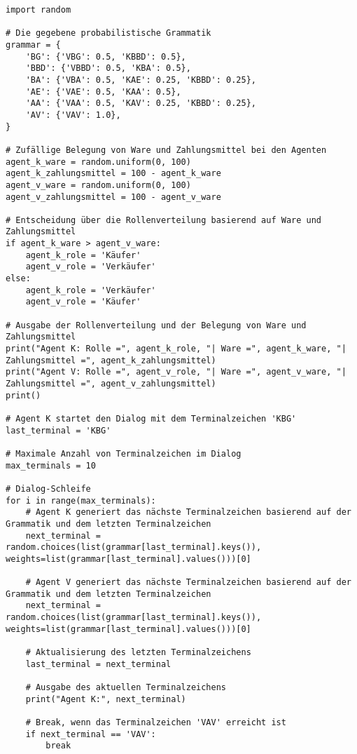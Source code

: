 \documentclass[12pt]{article}
\begin{document}
\begin{verbatim}
import random

# Die gegebene probabilistische Grammatik
grammar = {
    'BG': {'VBG': 0.5, 'KBBD': 0.5},
    'BBD': {'VBBD': 0.5, 'KBA': 0.5},
    'BA': {'VBA': 0.5, 'KAE': 0.25, 'KBBD': 0.25},
    'AE': {'VAE': 0.5, 'KAA': 0.5},
    'AA': {'VAA': 0.5, 'KAV': 0.25, 'KBBD': 0.25},
    'AV': {'VAV': 1.0},
}

# Zufällige Belegung von Ware und Zahlungsmittel bei den Agenten
agent_k_ware = random.uniform(0, 100)
agent_k_zahlungsmittel = 100 - agent_k_ware
agent_v_ware = random.uniform(0, 100)
agent_v_zahlungsmittel = 100 - agent_v_ware

# Entscheidung über die Rollenverteilung basierend auf Ware und Zahlungsmittel
if agent_k_ware > agent_v_ware:
    agent_k_role = 'Käufer'
    agent_v_role = 'Verkäufer'
else:
    agent_k_role = 'Verkäufer'
    agent_v_role = 'Käufer'

# Ausgabe der Rollenverteilung und der Belegung von Ware und Zahlungsmittel
print("Agent K: Rolle =", agent_k_role, "| Ware =", agent_k_ware, "| Zahlungsmittel =", agent_k_zahlungsmittel)
print("Agent V: Rolle =", agent_v_role, "| Ware =", agent_v_ware, "| Zahlungsmittel =", agent_v_zahlungsmittel)
print()

# Agent K startet den Dialog mit dem Terminalzeichen 'KBG'
last_terminal = 'KBG'

# Maximale Anzahl von Terminalzeichen im Dialog
max_terminals = 10

# Dialog-Schleife
for i in range(max_terminals):
    # Agent K generiert das nächste Terminalzeichen basierend auf der Grammatik und dem letzten Terminalzeichen
    next_terminal = random.choices(list(grammar[last_terminal].keys()), weights=list(grammar[last_terminal].values()))[0]
    
    # Agent V generiert das nächste Terminalzeichen basierend auf der Grammatik und dem letzten Terminalzeichen
    next_terminal = random.choices(list(grammar[last_terminal].keys()), weights=list(grammar[last_terminal].values()))[0]

    # Aktualisierung des letzten Terminalzeichens
    last_terminal = next_terminal
    
    # Ausgabe des aktuellen Terminalzeichens
    print("Agent K:", next_terminal)

    # Break, wenn das Terminalzeichen 'VAV' erreicht ist
    if next_terminal == 'VAV':
        break

\end{verbatim}
\end{document}
